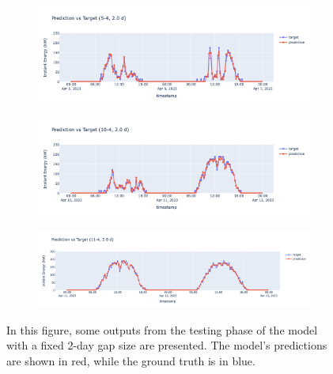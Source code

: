 \begin{figure}[]
	\centering
	\begin{subfigure}{\textwidth}
		\centering
		\includegraphics[width=\textwidth]{chapters/3_models/imgs/gab/eval/2days/gab2gionri54.png}
		\caption{}
	\end{subfigure}
	\begin{subfigure}{\textwidth}
		\centering
		\includegraphics[width=\textwidth]{chapters/3_models/imgs/gab/eval/2days/gab2giorni104.png}
		\caption{}
	\end{subfigure}
	\begin{subfigure}{\textwidth}
		\centering
		\includegraphics[width=\textwidth]{chapters/3_models/imgs/gab/eval/gabeval2giornibucobello.png}
		\caption{}
	\end{subfigure}
	\caption{In this figure, some outputs from the testing phase of the model with a fixed 2-day gap size are presented. The model's predictions are shown in red, while the ground truth is in blue.}

\end{figure}
